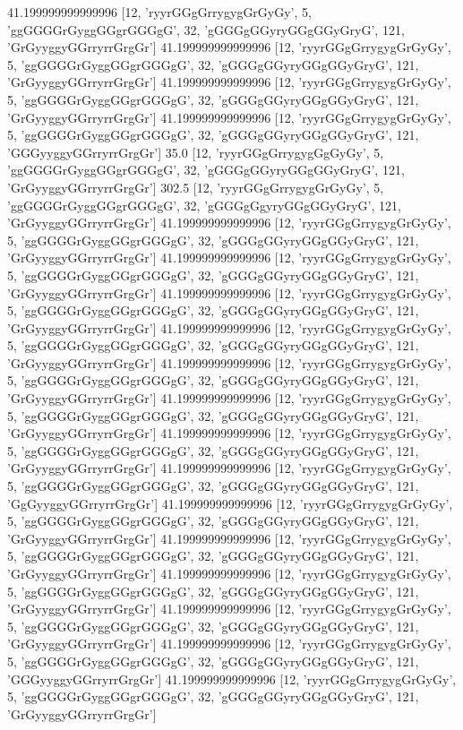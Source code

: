 41.199999999999996 [12, 'ryyrGGgGrrygygGrGyGy', 5, 'ggGGGGrGyggGGgrGGGgG', 32, 'gGGGgGGyryGGgGGyGryG', 121, 'GrGyyggyGGrryrrGrgGr']
41.199999999999996 [12, 'ryyrGGgGrrygygGrGyGy', 5, 'ggGGGGrGyggGGgrGGGgG', 32, 'gGGGgGGyryGGgGGyGryG', 121, 'GrGyyggyGGrryrrGrgGr']
41.199999999999996 [12, 'ryyrGGgGrrygygGrGyGy', 5, 'ggGGGGrGyggGGgrGGGgG', 32, 'gGGGgGGyryGGgGGyGryG', 121, 'GrGyyggyGGrryrrGrgGr']
41.199999999999996 [12, 'ryyrGGgGrrygygGrGyGy', 5, 'ggGGGGrGyggGGgrGGGgG', 32, 'gGGGgGGyryGGgGGyGryG', 121, 'GGGyyggyGGrryrrGrgGr']
35.0 [12, 'ryyrGGgGrrygygGgGyGy', 5, 'ggGGGGrGyggGGgrGGGgG', 32, 'gGGGgGGyryGGgGGyGryG', 121, 'GrGyyggyGGrryrrGrgGr']
302.5 [12, 'ryyrGGgGrrygygGrGyGy', 5, 'ggGGGGrGyggGGgrGGGgG', 32, 'gGGGgGgyryGGgGGyGryG', 121, 'GrGyyggyGGrryrrGrgGr']
41.199999999999996 [12, 'ryyrGGgGrrygygGrGyGy', 5, 'ggGGGGrGyggGGgrGGGgG', 32, 'gGGGgGGyryGGgGGyGryG', 121, 'GrGyyggyGGrryrrGrgGr']
41.199999999999996 [12, 'ryyrGGgGrrygygGrGyGy', 5, 'ggGGGGrGyggGGgrGGGgG', 32, 'gGGGgGGyryGGgGGyGryG', 121, 'GrGyyggyGGrryrrGrgGr']
41.199999999999996 [12, 'ryyrGGgGrrygygGrGyGy', 5, 'ggGGGGrGyggGGgrGGGgG', 32, 'gGGGgGGyryGGgGGyGryG', 121, 'GrGyyggyGGrryrrGrgGr']
41.199999999999996 [12, 'ryyrGGgGrrygygGrGyGy', 5, 'ggGGGGrGyggGGgrGGGgG', 32, 'gGGGgGGyryGGgGGyGryG', 121, 'GrGyyggyGGrryrrGrgGr']
41.199999999999996 [12, 'ryyrGGgGrrygygGrGyGy', 5, 'ggGGGGrGyggGGgrGGGgG', 32, 'gGGGgGGyryGGgGGyGryG', 121, 'GrGyyggyGGrryrrGrgGr']
41.199999999999996 [12, 'ryyrGGgGrrygygGrGyGy', 5, 'ggGGGGrGyggGGgrGGGgG', 32, 'gGGGgGGyryGGgGGyGryG', 121, 'GrGyyggyGGrryrrGrgGr']
41.199999999999996 [12, 'ryyrGGgGrrygygGrGyGy', 5, 'ggGGGGrGyggGGgrGGGgG', 32, 'gGGGgGGyryGGgGGyGryG', 121, 'GrGyyggyGGrryrrGrgGr']
41.199999999999996 [12, 'ryyrGGgGrrygygGrGyGy', 5, 'ggGGGGrGyggGGgrGGGgG', 32, 'gGGGgGGyryGGgGGyGryG', 121, 'GgGyyggyGGrryrrGrgGr']
41.199999999999996 [12, 'ryyrGGgGrrygygGrGyGy', 5, 'ggGGGGrGyggGGgrGGGgG', 32, 'gGGGgGGyryGGgGGyGryG', 121, 'GrGyyggyGGrryrrGrgGr']
41.199999999999996 [12, 'ryyrGGgGrrygygGrGyGy', 5, 'ggGGGGrGyggGGgrGGGgG', 32, 'gGGGgGGyryGGgGGyGryG', 121, 'GrGyyggyGGrryrrGrgGr']
41.199999999999996 [12, 'ryyrGGgGrrygygGrGyGy', 5, 'ggGGGGrGyggGGgrGGGgG', 32, 'gGGGgGGyryGGgGGyGryG', 121, 'GrGyyggyGGrryrrGrgGr']
41.199999999999996 [12, 'ryyrGGgGrrygygGrGyGy', 5, 'ggGGGGrGyggGGgrGGGgG', 32, 'gGGGgGGyryGGgGGyGryG', 121, 'GrGyyggyGGrryrrGrgGr']
41.199999999999996 [12, 'ryyrGGgGrrygygGrGyGy', 5, 'ggGGGGrGyggGGgrGGGgG', 32, 'gGGGgGGyryGGgGGyGryG', 121, 'GGGyyggyGGrryrrGrgGr']
41.199999999999996 [12, 'ryyrGGgGrrygygGrGyGy', 5, 'ggGGGGrGyggGGgrGGGgG', 32, 'gGGGgGGyryGGgGGyGryG', 121, 'GrGyyggyGGrryrrGrgGr']
